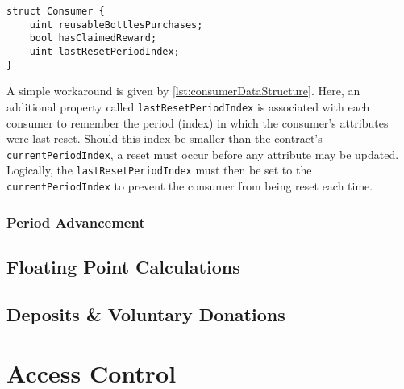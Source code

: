 \begin{lstlisting}[language=Solidity, caption=Consumer data structure, label=lst:consumerDataStructure]
struct Consumer {
	uint reusableBottlesPurchases;
	bool hasClaimedReward;
	uint lastResetPeriodIndex;
}
\end{lstlisting}

A simple workaround is given by \autoref{lst:consumerDataStructure}. Here, an additional property called \texttt{lastResetPeriodIndex} is associated with each consumer to remember the period (index) in which the consumer's attributes were last reset. Should this index be smaller than the contract's \texttt{currentPeriodIndex}, a reset must occur before any attribute may be updated. Logically, the \texttt{lastResetPeriodIndex} must then be set to the \texttt{currentPeriodIndex} to prevent the consumer from being reset each time.

\subsubsection{Period Advancement}



\subsection{Floating Point Calculations}
\subsection{Deposits \& Voluntary Donations}

\section{Access Control}
